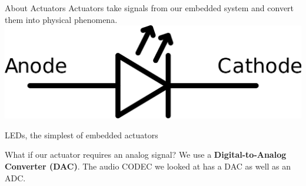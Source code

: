 \documentclass[aspectratio=169]{beamer}
\begin{document}
\begin{frame}{About Actuators}
Actuators take signals from our embedded system and convert them into physical phenomena. \\
\includegraphics[scale=0.12,keepaspectratio,center]{img/2000px-LED_symbol.svg.png}
\begin{center}\begin{footnotesize}LEDs, the simplest of embedded actuators\end{footnotesize}\end{center} 
\vspace{2em}
What if our actuator requires an analog signal? We use a \textbf{Digital-to-Analog Converter (DAC)}. The audio CODEC we looked at has a DAC as well as an ADC.
\end{frame}  

  
  
\end{document}
